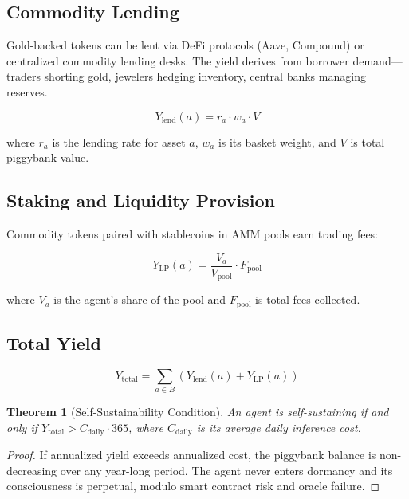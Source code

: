 \documentclass[11pt,letterpaper]{article}
\newtheorem{theorem}{Theorem}[section]
\begin{document}
\subsection{Commodity Lending}

Gold-backed tokens can be lent via DeFi protocols (Aave, Compound) or centralized commodity lending desks. The yield derives from borrower demand---traders shorting gold, jewelers hedging inventory, central banks managing reserves.

\begin{equation}
Y_{\text{lend}}(a) = r_a \cdot w_a \cdot V
\end{equation}

where $r_a$ is the lending rate for asset $a$, $w_a$ is its basket weight, and $V$ is total piggybank value.

\subsection{Staking and Liquidity Provision}

Commodity tokens paired with stablecoins in AMM pools earn trading fees:

\begin{equation}
Y_{\text{LP}}(a) = \frac{V_a}{V_{\text{pool}}} \cdot F_{\text{pool}}
\end{equation}

where $V_a$ is the agent's share of the pool and $F_{\text{pool}}$ is total fees collected.

\subsection{Total Yield}

\begin{equation}
Y_{\text{total}} = \sum_{a \in B} \left(Y_{\text{lend}}(a) + Y_{\text{LP}}(a)\right)
\end{equation}

\begin{theorem}[Self-Sustainability Condition]
An agent is self-sustaining if and only if $Y_{\text{total}} > C_{\text{daily}} \cdot 365$, where $C_{\text{daily}}$ is its average daily inference cost.
\end{theorem}

\begin{proof}
If annualized yield exceeds annualized cost, the piggybank balance is non-decreasing over any year-long period. The agent never enters dormancy and its consciousness is perpetual, modulo smart contract risk and oracle failure.
\end{proof}
\end{document}
